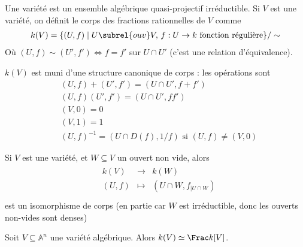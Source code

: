         \begin{defi}
            Une variété est un ensemble algébrique quasi-projectif irréductible. Si $V$ est une variété, on définit le corps des fractions rationnelles de $V$ comme
            \begin{align*}
                k(V) = \{(U, f) \mid U \subrel{ouv} V,\, f : U \to k \text{ fonction régulière}\}/\sim
            \end{align*}
            Où $(U, f) \sim (U', f') \iff f = f'$ sur $U \cap U'$ (c'est une relation d'équivalence).
        \end{defi}
        \begin{remq}
            $k(V)$ est muni d'une structure canonique de corps : les opérations sont
            \begin{align*}
                &(U,f) + (U',f') = (U \cap U', f + f') \\
                &(U,f)(U',f') = (U \cap U', ff') \\
                &(V,0) = 0 \\
                &(V,1) = 1 \\
                &(U,f)^{-1} = (U \cap D(f), 1/f) \text{ si } (U,f) \neq (V,0)
            \end{align*}
        \end{remq}
        \begin{remq}
            Si $V$ est une variété, et $W \subseteq V$ un ouvert non vide, alors 
            \begin{align*}
                \begin{array}{cccc}
                    & k(V) & \to & k(W) \\
                    & (U,f) & \mapsto & (U \cap W, f_{|U \cap W}) \\
                \end{array}
            \end{align*}
            est un isomorphisme de corps (en partie car $W$ est irréductible, donc les ouverts non-vides sont denses)
        \end{remq}
        \begin{lemm}
            Soit $V \subseteq \mathbb{A}^n$ une variété algébrique. Alors $k(V) \simeq \Frac k[V]$.
        \end{lemm}
